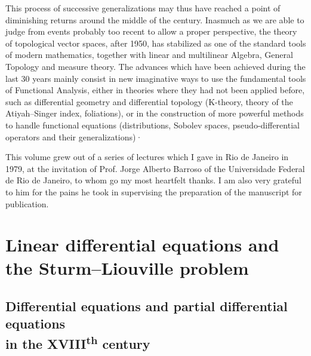 \documentclass[12pt,a4paper,leqno,twoside]{extbook}
\renewcommand{\thechapter}{\Roman{chapter}}
\newcommand{\supth}{\texorpdfstring{\textsuperscript{th}}{th}}
\begin{document}
This process of successive generalizations may thus have reached a point of diminishing returns around the middle of the century. Inasmuch as we are able to judge from events probably too recent to allow a proper perspective, the theory of topological vector spaces, after 1950, has stabilized as one of the standard tools of modern mathematics, together with linear and multilinear Algebra, General Topology and measure theory. The advances which have been achieved during the last 30 years mainly consist in new imaginative ways to use the fundamental tools of Functional Analysis, either in theories where they had not been applied before, such as differential geometry and differential topology (K-theory, theory of the Atiyah--Singer index, foliations), or in the construction of more powerful methods to handle functional equations (distributions, Sobolev spaces, pseudo-differential operators and their generalizations)·

This volume grew out of a series of lectures which I gave in Rio de Janeiro in 1979, at the invitation of Prof. Jorge Alberto Barroso of the Universidade Federal de Rio de Janeiro, to whom go my most heartfelt thanks. I am also very grateful to him for the pains he took in supervising the preparation of the manuscript for publication.

\clearpage

\fancyhead[EC]{\textsc{chapter} \thechapter}
\fancyhead[OC]{\textsc{\leftmark}}

\chapter{Linear differential equations and the Sturm--Liouville problem}
\label{ch:1}
\setcounter{equation}{0}

\section[Differential equations and partial differential equations in the XVIII\supth{} century]{Differential equations and partial differential equations\\in the XVIII\supth{} century}
\label{sec:1.1}
\end{document}
